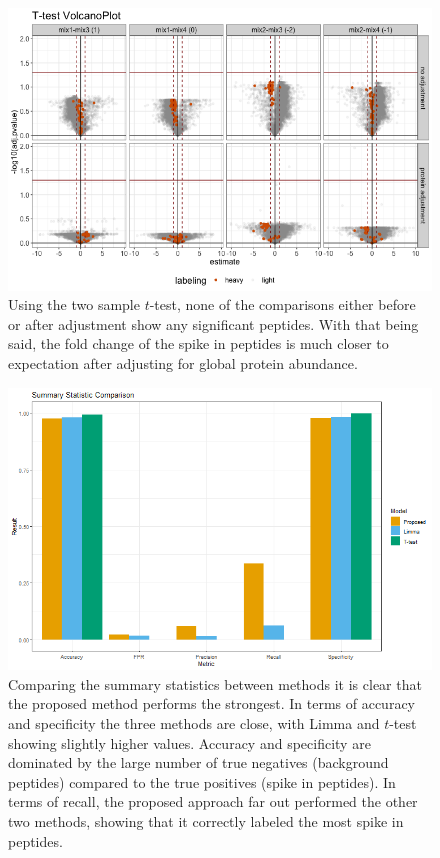 \documentclass{mcp}
\begin{document}
\begin{figure}[h!]
\centering
\includegraphics[width=.85\textwidth]{sim_new/spike_in_ttest_volcano}
\caption{Using the two sample $t$-test, none of the comparisons either before or after adjustment show any significant peptides. With that being said, the fold change of the spike in peptides is much closer to expectation after adjusting for global protein abundance. \label{fig:spike_volcano_ttest}}
\end{figure}

\begin{figure}[h!]
\centering
\includegraphics[width=.85\textwidth]{sim_new/spike_in_statistic_comparison}
\caption{Comparing the summary statistics between methods it is clear that the proposed method performs the strongest. In terms of accuracy and specificity the three methods are close, with Limma and $t$-test showing slightly higher values. Accuracy and specificity are dominated by the large number of true negatives (background peptides) compared to the true positives (spike in peptides). In terms of recall, the proposed approach far out performed the other two methods, showing that it correctly labeled the most spike in peptides. \label{fig:spike_stat}}
\end{figure}
\end{document}
